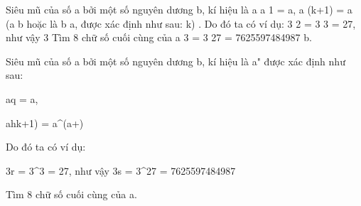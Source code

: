 Siêu mũ của số a bởi một số nguyên dương b, kí hiệu là a       a 1 = a,       a (k+1) = a (a       b hoặc là b a, được xác định như sau:       k)       .       Do đó ta có ví dụ: 3       2 = 3 3 = 27, như vậy 3       Tìm 8 chữ số cuối cùng của a       3 = 3 27 = 7625597484987       b.    

   Siêu mũ của số a bởi một số nguyên dương b, kí hiệu là a^^b được xác định như sau:  

   a^^1 = a,  

   a^^(k+1) = a^(a^^k)  

   Do đó ta có ví dụ:  

   3^^2 = 3^3 = 27, như vậy 3^^3 = 3^27 = 7625597484987  

   Tìm 8 chữ số cuối cùng của a.  



\